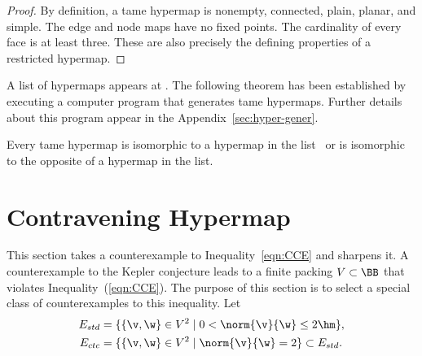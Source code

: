 \begin{proof}
  By definition, a tame hypermap is nonempty, connected, plain,
  planar, and simple.  The edge and node maps
  have no fixed points.  The cardinality of every face is at least
  three.  These are also precisely the defining properties of a restricted
  hypermap.
\end{proof}


A list of hypermaps appears at \cite{website:Hales:1998:Code}.  The following
theorem has been established by executing a computer program that generates
tame hypermaps.  Further details about this program appear in
the Appendix~\ref{sec:hyper-gener}.

%

\begin{theorem}
  \label{theorem:classification} Every tame hypermap is isomorphic to
  a hypermap in the list~\cite{website:Hales:1998:Code} or is
  isomorphic to the opposite of a hypermap in the list.
\end{theorem}



%
%

\section{Contravening Hypermap}

This section takes a counterexample to Inequality~\ref{eqn:CCE} and  sharpens it.
%
A counterexample to the Kepler conjecture leads to a finite packing
$V\subset \BB$ that violates Inequality~(\ref{eqn:CCE}).  The
purpose of this section is to select a special class of
counterexamples to this inequality.  Let
\begin{align}\label{eqn:fan-edge}
E_{std} &= \{\{\v,\w\}\in V^2\mid 0 < \norm{\v}{\w}\le 2\hm \},\\
E_{ctc} &= \{ \{\v,\w\}\in V^2\mid \norm{\v}{\w}= 2 \}\subset E_{std}.
\end{align}

